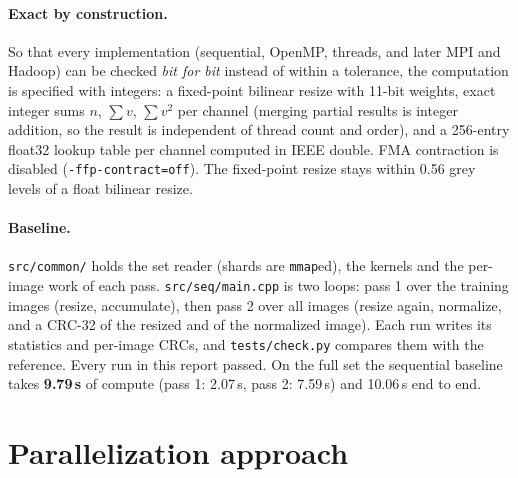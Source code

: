 \documentclass{zc-ust-hw}
\begin{document}
\paragraph{Exact by construction.} So that every implementation (sequential, OpenMP, threads,
and later MPI and Hadoop) can be checked \emph{bit for bit} instead of within a tolerance, the
computation is specified with integers: a fixed-point bilinear resize with 11-bit weights,
exact integer sums $n$, $\sum v$, $\sum v^2$ per channel (merging partial results is integer
addition, so the result is independent of thread count and order), and a 256-entry float32
lookup table per channel computed in IEEE double. FMA contraction is disabled
(\texttt{-ffp-contract=off}). The fixed-point resize stays within 0.56 grey levels of a float
bilinear resize.

\paragraph{Baseline.} \texttt{src/common/} holds the set reader (shards are \texttt{mmap}ed), the
kernels and the per-image work of each pass. \texttt{src/seq/main.cpp} is two loops: pass 1 over
the training images (resize, accumulate), then pass 2 over all images (resize again, normalize,
and a CRC-32 of the resized and of the normalized image). Each run writes its statistics and
per-image CRCs, and \texttt{tests/check.py} compares them with the reference. Every run in this
report passed. On the full set the sequential baseline takes \textbf{9.79\,s} of compute
(pass 1: 2.07\,s, pass 2: 7.59\,s) and 10.06\,s end to end.

\section{Parallelization approach}
\end{document}
